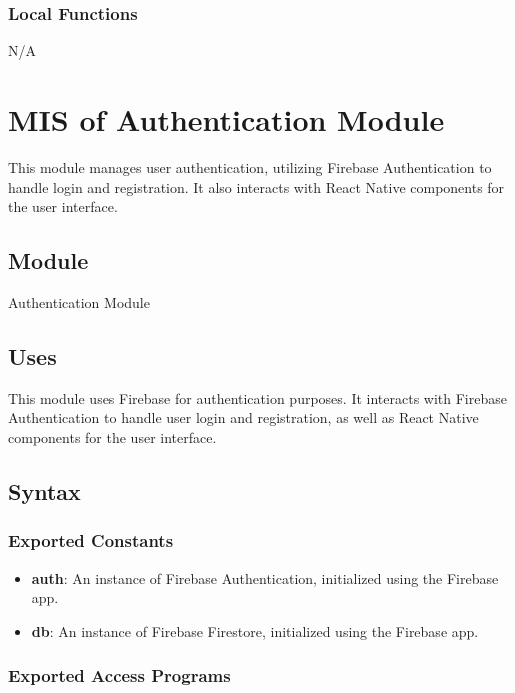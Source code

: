 \documentclass[12pt, titlepage]{article}
\begin{document}
\subsubsection{Local Functions}
N/A

\newpage


\section{MIS of Authentication Module}\label{Authentication_Module}
This module manages user authentication, utilizing Firebase Authentication to handle login and registration. It also interacts with React Native components for the user interface.

\subsection{Module}

Authentication Module

\subsection{Uses}
This module uses Firebase for authentication purposes. It interacts with
Firebase Authentication to handle user login and registration, as well as React
Native components for the user interface.

\subsection{Syntax}

\subsubsection{Exported Constants}

\begin{itemize}
    \item \textbf{auth}: An instance of Firebase Authentication, initialized using the Firebase app.
    \item \textbf{db}: An instance of Firebase Firestore, initialized using the Firebase app.
\end{itemize}

\subsubsection{Exported Access Programs}
\end{document}
